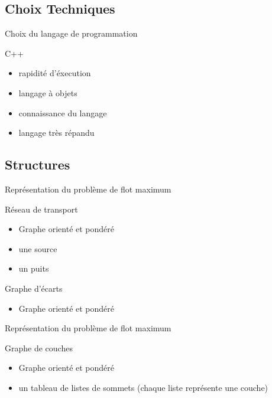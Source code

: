 \subsection{Choix Techniques}
\begin{frame}{Choix du langage de programmation}
\begin{block}{C++}
  \begin{itemize}
    \item rapidité d'éxecution
    \item langage à objets
    \item connaissance du langage
    \item langage très répandu
  \end{itemize}
\end{block}
\end{frame}

\subsection{Structures}
\begin{frame}{Représentation du problème de flot maximum}

\begin{block}{Réseau de transport}
  \begin{itemize}
    \item Graphe orienté et pondéré
    \item une source
    \item un puits
  \end{itemize}
\end{block}
\begin{block}{Graphe d'écarts}
  \begin{itemize}
    \item Graphe orienté et pondéré
  \end{itemize}
\end{block}
\end{frame}


\begin{frame}{Représentation du problème de flot maximum}
\begin{block}{Graphe de couches}
  \begin{itemize}
    \item Graphe orienté et pondéré
    \item un tableau de listes de sommets (chaque liste représente une couche)
  \end{itemize}
\end{block}
\end{frame}

